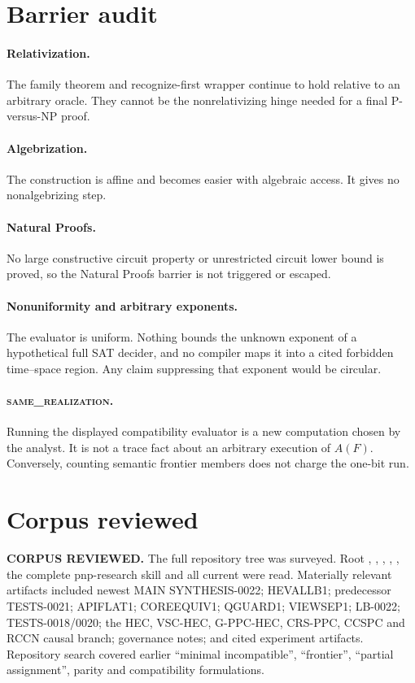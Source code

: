 \documentclass[11pt]{article}
\newcommand{\same}{\textsc{same\_realization}}
\begin{document}
\section{Barrier audit}

\paragraph{Relativization.}
The family theorem and recognize-first wrapper continue to hold relative to an
arbitrary oracle.  They cannot be the nonrelativizing hinge needed for a final
P-versus-NP proof.

\paragraph{Algebrization.}
The construction is affine and becomes easier with algebraic access.  It gives
no nonalgebrizing step.

\paragraph{Natural Proofs.}
No large constructive circuit property or unrestricted circuit lower bound is
proved, so the Natural Proofs barrier is not triggered or escaped.

\paragraph{Nonuniformity and arbitrary exponents.}
The evaluator is uniform.  Nothing bounds the unknown exponent of a hypothetical
full SAT decider, and no compiler maps it into a cited forbidden time--space
region.  Any claim suppressing that exponent would be circular.

\paragraph{\same.}
Running the displayed compatibility evaluator is a new computation chosen by
the analyst.  It is not a trace fact about an arbitrary execution of $A(F)$.
Conversely, counting semantic frontier members does not charge the one-bit run.

\section{Corpus reviewed}

\textbf{CORPUS REVIEWED.}  The full repository tree was surveyed.  Root
, , , ,
, the complete pnp-research skill and all current
 were read.  Materially relevant artifacts included newest MAIN
SYNTHESIS-0022; HEVALLB1; predecessor TESTS-0021; APIFLAT1; COREEQUIV1;
QGUARD1; VIEWSEP1; LB-0022; TESTS-0018/0020; the HEC, VSC-HEC, G-PPC-HEC,
CRS-PPC, CCSPC and RCCN causal branch; governance notes; and cited experiment
artifacts.  Repository search covered earlier ``minimal incompatible'',
``frontier'', ``partial assignment'', parity and compatibility formulations.
\end{document}
